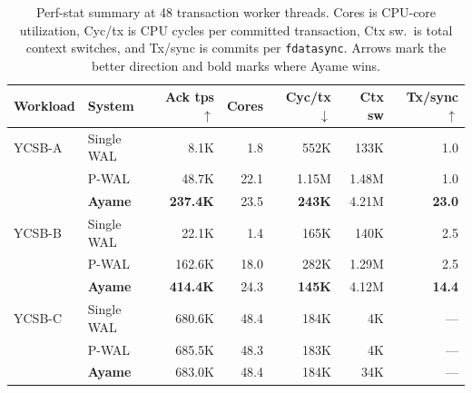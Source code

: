 \begin{table}[t]
  \centering
  \caption{Perf-stat summary at 48 transaction worker threads.  Cores is CPU-core utilization, Cyc/tx is CPU cycles per committed transaction, Ctx sw.\ is total context switches, and Tx/sync is commits per \texttt{fdatasync}.  Arrows mark the better direction and bold marks where Ayame wins.}
  \label{tab:perf-stat-48worker}
  \small
  \setlength{\tabcolsep}{6pt}
  \begin{tabular}{llrrrrr}
    \hline
    Workload & System & Ack tps $\uparrow$ & Cores & Cyc/tx $\downarrow$ & Ctx sw & Tx/sync $\uparrow$ \\
    \hline
    YCSB-A & Single WAL & 8.1K & 1.8 & 552K & 133K & 1.0 \\
     & P-WAL & 48.7K & 22.1 & 1.15M & 1.48M & 1.0 \\
     & \textbf{Ayame} & \textbf{237.4K} & 23.5 & \textbf{243K} & 4.21M & \textbf{23.0} \\
    \hline
    YCSB-B & Single WAL & 22.1K & 1.4 & 165K & 140K & 2.5 \\
     & P-WAL & 162.6K & 18.0 & 282K & 1.29M & 2.5 \\
     & \textbf{Ayame} & \textbf{414.4K} & 24.3 & \textbf{145K} & 4.12M & \textbf{14.4} \\
    \hline
    YCSB-C & Single WAL & 680.6K & 48.4 & 184K & 4K & --- \\
     & P-WAL & 685.5K & 48.3 & 183K & 4K & --- \\
     & \textbf{Ayame} & 683.0K & 48.4 & 184K & 34K & --- \\
    \hline
  \end{tabular}
\end{table}
